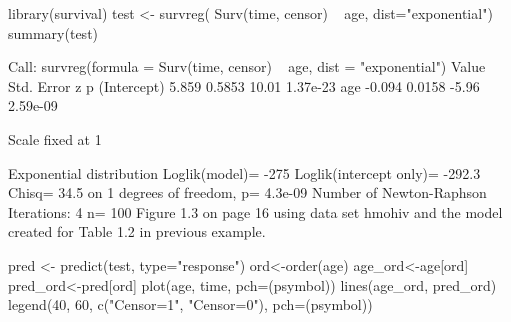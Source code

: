 library(survival)
test <- survreg( Surv(time, censor) ~ age, dist="exponential")
summary(test)

Call:
survreg(formula = Surv(time, censor) ~ age, dist = "exponential")
             Value Std. Error     z        p
(Intercept)  5.859     0.5853 10.01 1.37e-23
age         -0.094     0.0158 -5.96 2.59e-09

Scale fixed at 1 

Exponential distribution
Loglik(model)= -275   Loglik(intercept only)= -292.3
        Chisq= 34.5 on 1 degrees of freedom, p= 4.3e-09 
Number of Newton-Raphson Iterations: 4 
n= 100 
Figure 1.3 on page 16 using data set hmohiv and the model created for Table 1.2 in previous example.

pred <- predict(test, type="response") 
ord<-order(age)
age_ord<-age[ord]
pred_ord<-pred[ord]
plot(age, time, pch=(psymbol))
lines(age_ord, pred_ord)
legend(40, 60, c("Censor=1", "Censor=0"), pch=(psymbol))

